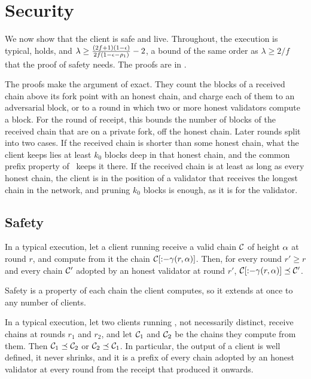 \section{Security}
\label{sec.analysis}

We now show that the client is safe and live. Throughout, the execution is
typical,  holds, and
$\lambda\ge\frac{(2f+1)(1-\epsilon)}{2f(1-\epsilon-\rho_1)}-2$, a bound of the
same order as $\lambda\ge2/f$ that the proof of safety needs. The proofs are in
.

The proofs make the argument of  exact. They count the
blocks of a received chain above its fork point with an honest chain, and
charge each of them to an adversarial block, or to a round in which two or more
honest validators compute a block. For the round of receipt, this bounds the number of
blocks of the received chain that are on a private fork, off the honest chain.
Later rounds split into two cases. If the received chain is shorter than some
honest chain, what the client keeps lies at least $k_0$ blocks deep in that
honest chain, and the common prefix property of~\cite{gkl24} keeps it there. If
the received chain is at least as long as every honest chain, the client is in
the position of a validator that receives the longest chain in the network, and
pruning $k_0$ blocks is enough, as it is for the validator.

\subsection{Safety}
\label{sec.safety}

\begin{theorem}[Safety]\label{thm.safety}
    In a typical execution, let a client running  receive a
    valid chain $\mathcal{C}$ of height $\alpha$ at round $r$, and compute from it the
    chain $\mathcal{C}[{:}{-}\gamma(r,\alpha)]$. Then, for every round $r'\ge r$ and
    every chain $\mathcal{C}'$ adopted by an honest validator at round $r'$,
    $\mathcal{C}[{:}{-}\gamma(r,\alpha)]\preceq\mathcal{C}'$.
\end{theorem}

Safety is a property of each chain the client computes, so it extends at once
to any number of clients.

\begin{corollary}[Consistency]\label{cor.consistency}
    In a typical execution, let two clients running , not
    necessarily distinct, receive chains at rounds $r_1$ and $r_2$, and let
    $\mathcal{C}_1$ and $\mathcal{C}_2$ be the chains they compute from them. Then
    $\mathcal{C}_1\preceq\mathcal{C}_2$ or $\mathcal{C}_2\preceq\mathcal{C}_1$. In particular, the output of a
    client is well defined, it never shrinks, and it is a prefix of every chain
    adopted by an honest validator at every round from the receipt that produced
    it onwards.
\end{corollary}

